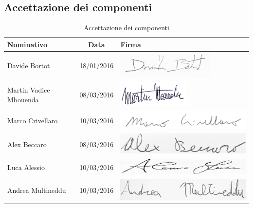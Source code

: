 \documentclass[a4paper,11pt]{article}
\begin{document}
	\subsection*{Accettazione dei componenti}
	\begin{table}[h!]
		\begin{tabularx}{\textwidth}{XcX}
			\textbf{Nominativo} & \textbf{Data} &\hspace{20 mm}  \textbf{Firma}\\
			\midrule
			Davide Bortot & 18/01/2016 & \hspace{20 mm} \includegraphics[scale=0.3]{../Firme/db.jpg}\\	
				Martin Vadice Mbouenda & 08/03/2016 & \hspace{20 mm} \includegraphics[scale=0.35]{../Firme/martin.png} \\ 
				Marco Crivellaro & 10/03/2016 &\hspace{20 mm} \includegraphics[scale=0.3]{../Firme/crivellaro.png} \\ 
				Alex Beccaro & 08/03/2016 & \hspace{20 mm} \includegraphics[scale=0.3]{../Firme/becks.jpg} \\ 
				Luca Alessio & 10/03/2016 & \hspace{20 mm} \includegraphics[scale=0.3]{../Firme/alessio.jpg} \\ 
				Andrea Multineddu & 10/03/2016 & \hspace{20 mm} \includegraphics[scale=0.3]{../Firme/multi.jpg} \\ 
			\bottomrule
		\end{tabularx}
	\caption{Accettazione dei componenti}
	\end{table}
		\newpage
\end{document}
